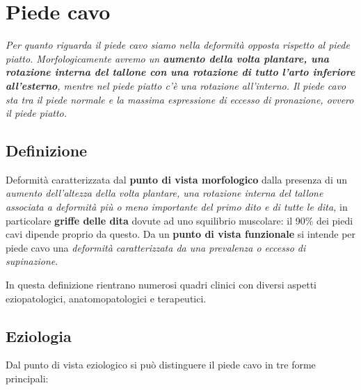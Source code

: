 \section{Piede cavo}

\emph{Per quanto riguarda il piede cavo siamo nella deformità opposta rispetto al piede piatto. Morfologicamente avremo un \textbf{\emph{aumento della volta plantare, una rotazione interna del tallone con una rotazione di tutto l'arto inferiore all'esterno}}, mentre nel piede piatto c'è una rotazione all'interno. Il piede cavo sta tra il piede normale e la massima espressione di eccesso di pronazione, ovvero il piede piatto.}

\subsection{Definizione}

Deformità caratterizzata dal \textbf{punto di vista morfologico} dalla presenza di un \emph{aumento dell'altezza della volta plantare, una rotazione interna del tallone associata a deformità più o meno importante del primo dito e di tutte le dita,} in particolare
\textbf{griffe delle dita} dovute ad uno squilibrio muscolare: il 90\% dei piedi cavi dipende proprio da questo. Da un \textbf{punto di vista funzionale} si intende per piede cavo una \emph{deformità caratterizzata
da una prevalenza o eccesso di supinazione}.

In questa definizione rientrano numerosi quadri clinici con diversi aspetti eziopatologici, anatomopatologici e terapeutici.

\subsection{Eziologia}

Dal punto di vista eziologico si può distinguere il piede cavo in tre forme principali:

